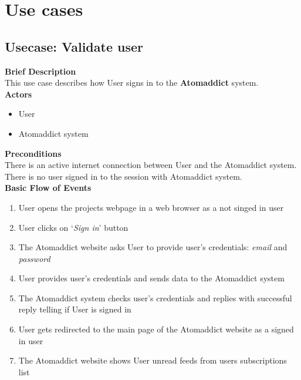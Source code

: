\documentclass[12pt]{article}
\begin{document}
\section{Use cases}
\subsection{Usecase: Validate user}
\textbf{Brief Description}\\
This use case describes how User signs in to the \textbf{Atomaddict} system.\\


\textbf{Actors}

\begin{itemize}

    \item User

    \item Atomaddict system

\end{itemize}

\vspace{0.5cm}


\textbf{Preconditions}\\
There is an active internet connection between User and the Atomaddict system. There is no user signed in to the session with Atomaddict system.\\


\textbf{Basic Flow of Events}

\begin{enumerate}

    \item User opens the projects webpage in a web browser as a not singed in user

    \item User clicks on `\emph{Sign in}' button 

    \item The Atomaddict website asks User to provide user's credentials: \emph{email} and \emph{password}

    \item User provides user's credentials and sends data to the Atomaddict system

    \item The Atomaddict system checks user's credentials and replies with successful reply telling if User is signed in

    \item User gets redirected to the main page of the Atomaddict website as a signed in user

    \item The Atomaddict website shows User unread feeds from users subscriptions list

\end{enumerate}
\end{document}
